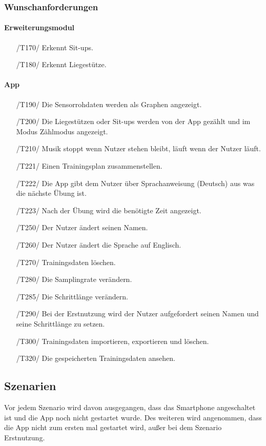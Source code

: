 \documentclass[a4paper,12pt]{article}
\begin{document}
\subsubsection{Wunschanforderungen}
  \paragraph{Erweiterungsmodul}
    \begin{itemize}
    \item[/T170/] Erkennt Sit-ups. 
    \item[/T180/] Erkennt Liegestütze.
  \end{itemize}
  \paragraph{App}
  \begin{itemize}
    \item[/T190/] Die Sensorrohdaten werden als Graphen angezeigt.
    \item[/T200/] Die Liegestützen oder Sit-ups werden von der App gezählt und im Modus \glqq{}Zählmodus \grqq{} angezeigt.
    \item[/T210/] Musik stoppt wenn Nutzer stehen bleibt, läuft wenn der Nutzer läuft.
    \item[/T221/] Einen Trainingsplan zusammenstellen.
    \item[/T222/] Die App gibt dem Nutzer über Sprachanweisung (Deutsch) aus was die nächste Übung ist.
    \item[/T223/] Nach der Übung wird die benötigte Zeit angezeigt.
    \item[/T250/] Der Nutzer ändert seinen Namen.
    \item[/T260/] Der Nutzer ändert die Sprache auf Englisch.
    \item[/T270/] Trainingsdaten löschen.
    \item[/T280/] Die Samplingrate verändern.
    \item[/T285/] Die Schrittlänge verändern.
    \item[/T290/] Bei der Erstnutzung wird der Nutzer aufgefordert seinen Namen und seine Schrittlänge zu setzen.
    \item[/T300/] Trainingsdaten importieren, exportieren und löschen.
    \item[/T320/] Die gespeicherten Trainingsdaten ansehen.
   \end{itemize}
   
  \subsection{Szenarien}
	Vor jedem Szenario wird davon ausgegangen, dass das Smartphone angeschaltet ist und die App noch nicht gestartet wurde. Des weiteren wird angenommen, dass die App nicht zum ersten mal gestartet wird, außer bei dem Szenario \glqq{}Erstnutzung\grqq{}.
\end{document}
